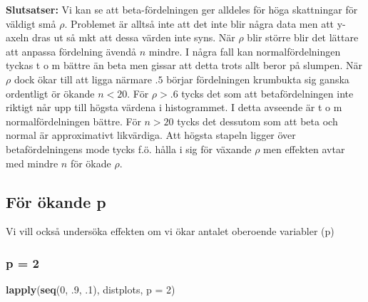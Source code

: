 \documentclass[]{article}
\newenvironment{Shaded}{\begin{snugshade}}{\end{snugshade}}
\newcommand{\KeywordTok}[1]{\textcolor[rgb]{0.13,0.29,0.53}{\textbf{{#1}}}}
\newcommand{\DataTypeTok}[1]{\textcolor[rgb]{0.13,0.29,0.53}{{#1}}}
\newcommand{\DecValTok}[1]{\textcolor[rgb]{0.00,0.00,0.81}{{#1}}}
\newcommand{\NormalTok}[1]{{#1}}
\begin{document}
\textbf{Slutsatser:} Vi kan se att beta-fördelningen ger alldeles för
höga skattningar för väldigt små \(\rho\). Problemet är alltså inte att
det inte blir några data men att y-axeln dras ut så mkt att dessa värden
inte syns. När \(\rho\) blir större blir det lättare att anpassa
fördelning ävendå \(n\) mindre. I några fall kan normalfördelningen
tyckas t o m bättre än beta men gissar att detta trots allt beror på
slumpen. När \(\rho\) dock ökar till att ligga närmare \(.5\) börjar
fördelningen krumbukta sig ganska ordentligt ör ökande \(n<20\). För
\(\rho > .6\) tycks det som att betafördelningen inte riktigt når upp
till högsta värdena i histogrammet. I detta avseende är t o m
normalfördelningen bättre. För \(n> 20\) tycks det dessutom som att beta
och normal är approximativt likvärdiga. Att högsta stapeln ligger över
betafördelningens mode tycks f.ö. hålla i sig för växande \(\rho\) men
effekten avtar med mindre \(n\) för ökade \(\rho\).

\subsection{För ökande p}\label{for-okande-p}

Vi vill också undersöka effekten om vi ökar antalet oberoende variabler
(p)

\subsubsection{p = 2}\label{p-2}

\begin{Shaded}
\begin{Highlighting}[]
\KeywordTok{lapply}\NormalTok{(}\KeywordTok{seq}\NormalTok{(}\DecValTok{0}\NormalTok{, .}\DecValTok{9}\NormalTok{, .}\DecValTok{1}\NormalTok{), distplots, }\DataTypeTok{p =} \DecValTok{2}\NormalTok{)}
\end{Highlighting}
\end{Shaded}
\end{document}
